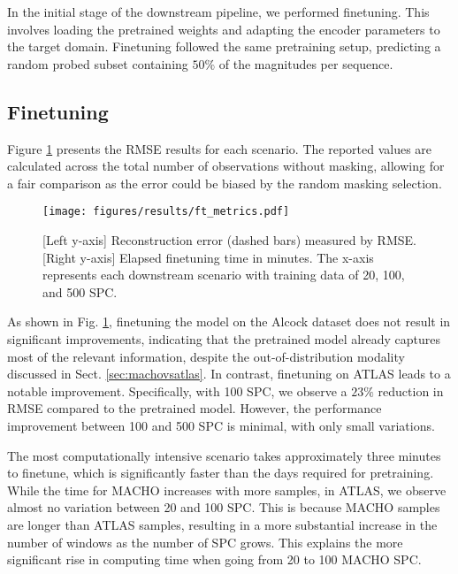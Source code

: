 In the initial stage of the downstream pipeline, we performed finetuning. This involves loading the pretrained weights and adapting the encoder parameters to the target domain. Finetuning followed the same pretraining setup, predicting a random probed subset containing $50\%$ of the magnitudes per sequence.



\subsection{Finetuning}
Figure \ref{fig:ft_metrics} presents the RMSE results for each scenario. The reported values are calculated across the total number of observations without masking, allowing for a fair comparison as the error could be biased by the random masking selection. 
\begin{figure}
    \centering
    \texttt{[image: figures/results/ft\_metrics.pdf]}
    \caption{[Left y-axis] Reconstruction error (dashed bars) measured by RMSE. [Right y-axis] Elapsed finetuning time in minutes. The x-axis represents each downstream scenario with training data of 20, 100, and 500 SPC.}
    \label{fig:ft_metrics}
\end{figure}
As shown in Fig. \ref{fig:ft_metrics}, finetuning the model on the Alcock dataset does not result in significant improvements, indicating that the pretrained model already captures most of the relevant information, despite the out-of-distribution modality discussed in Sect. \ref{sec:machovsatlas}. In contrast, finetuning on ATLAS leads to a notable improvement. Specifically, with 100 SPC, we observe a $23\%$ reduction in RMSE compared to the pretrained model. However, the performance improvement between 100 and 500 SPC is minimal, with only small variations.

The most computationally intensive scenario takes approximately three minutes to finetune, which is significantly faster than the days required for pretraining. While the time for MACHO increases with more samples, in ATLAS, we observe almost no variation between 20 and 100 SPC. This is because MACHO samples are longer than ATLAS samples, resulting in a more substantial increase in the number of windows as the number of SPC grows. This explains the more significant rise in computing time when going from 20 to 100 MACHO SPC.

